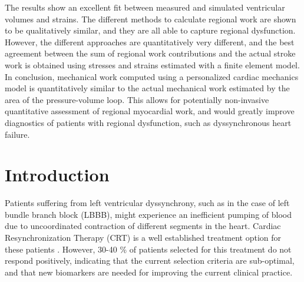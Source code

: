 The results show an excellent fit between measured and simulated
ventricular volumes and strains. The different methods to calculate
regional work are shown to be qualitatively similar, and they are all
able to capture regional dysfunction. However, the different
approaches are quantitatively very different, and the best agreement
between the sum of regional work contributions and the actual stroke
work is obtained using stresses and strains estimated with a finite
element model. In conclusion, mechanical work computed using a
personalized cardiac mechanics model is quantitatively similar to the
actual mechanical work estimated by the area of the pressure-volume
loop. This allows for potentially non-invasive quantitative assessment
of regional myocardial work, and would greatly improve diagnostics of
patients with regional dysfunction, such as dyssynchronous heart
failure.

\section{Introduction}




Patients suffering
from left ventricular dyssynchrony, such as in the 
case of left bundle branch block (LBBB), might experience an inefficient pumping
of blood due to uncoordinated contraction of different
segments in the heart. Cardiac Resynchronization Therapy (CRT) is
a well established treatment option for these patients \cite[Section
8.2]{ponikowski20162016}. However, 30-40 \% of patients selected for
this treatment do not respond positively, indicating that the current
selection criteria are sub-optimal, and that new biomarkers are needed
for improving the current clinical practice. 

